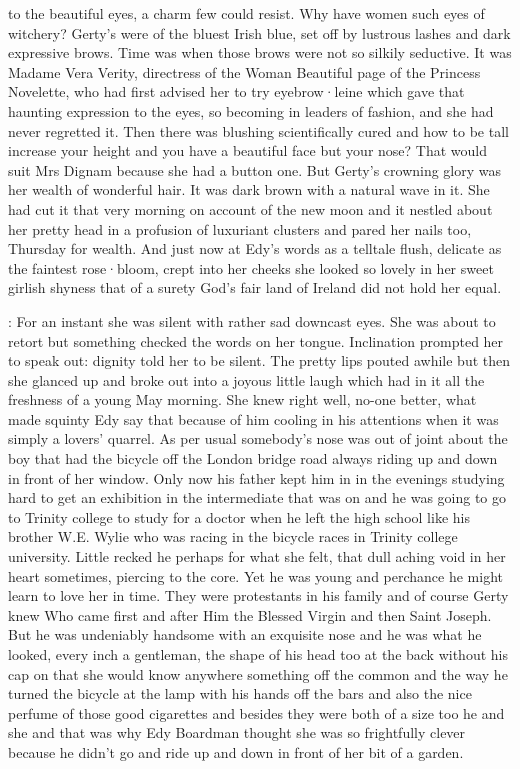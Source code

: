 to the beautiful eyes,
a charm few could resist.
Why have women such eyes of witchery?
Gerty's were of the bluest Irish blue,
set off by lustrous lashes
and dark expressive brows.
Time was
when those brows were not so silkily seductive.
It was Madame Vera Verity,
directress of the Woman Beautiful page of the Princess Novelette,
who had first advised her
to try eyebrow·leine
which gave that haunting expression to the eyes,
so becoming in leaders of fashion,
and she had never regretted it.
Then there was blushing scientifically cured
and how to be tall
increase your height
and you have a beautiful face
but your nose?
That would suit Mrs Dignam
because she had a button one.
But Gerty's crowning glory
was her wealth of wonderful hair.
It was dark brown
with a natural wave in it.
She had cut it that very morning
on account of the new moon
and it nestled about her pretty head
in a profusion of luxuriant clusters
and pared her nails too,
Thursday for wealth.
And just now
at Edy's words
as a telltale flush,
delicate as the faintest rose·bloom,
crept into her cheeks
she looked so lovely
in her sweet girlish shyness
that of a surety
God's fair land of Ireland
did not hold her equal.

:
For an instant
she was silent
with rather sad downcast eyes.
She was about to retort
but something checked the words on her tongue.
Inclination prompted her to speak out:
dignity told her to be silent.
The pretty lips pouted awhile
but then she glanced up
and broke out into a joyous little laugh
which had in it
all the freshness
of a young May morning.
She knew right well,
no-one better,
what made squinty Edy say that
because of him cooling in his attentions
when it was simply a lovers' quarrel.
As per usual
somebody's nose was out of joint
about the boy that had the bicycle
off the London bridge road
always riding up and down
in front of her window.
Only now
his father kept him in
in the evenings
studying hard to get an exhibition
in the intermediate that was on
and he was going to go to Trinity college
to study for a doctor
when he left the high school
like his brother W.E. Wylie
who was racing in the bicycle races in Trinity college university.
Little recked he perhaps
for what she felt,
that dull aching void in her heart sometimes,
piercing to the core.
Yet he was young
and perchance he might learn to love her
in time.
They were protestants in his family
and of course
Gerty knew Who came first
and after Him the Blessed Virgin
and then Saint Joseph.
But he was undeniably handsome
with an exquisite nose
and he was what he looked,
every inch a gentleman,
the shape of his head too
at the back without his cap on
that she would know anywhere
something off the common
and the way he turned the bicycle at the lamp
with his hands off the bars
and also the nice perfume of those good cigarettes
and besides
they were both of a size too
he and she
and that was why
Edy Boardman thought she was so frightfully clever
because he didn't go
and ride up and down
in front of her bit of a garden.

